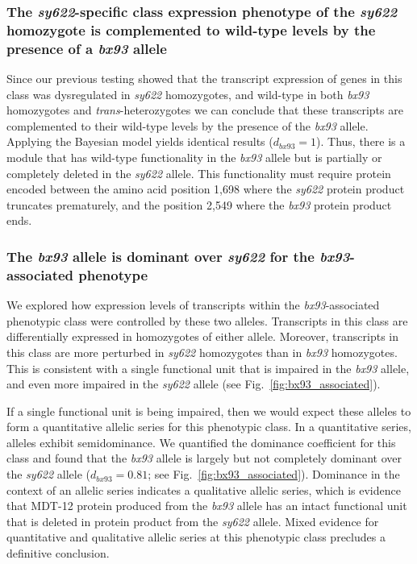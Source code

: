 \documentclass[10pt, twocolumn]{article}
\newcommand{\protein}[1]{\mbox{\uppercase{#1}}}
\begin{document}
\subsubsection*{The \emph{sy622}-specific class expression phenotype of the
                \emph{sy622} homozygote is complemented to wild-type levels by
                the presence of a \emph{bx93} allele}
Since our previous testing showed that the transcript expression of genes in
this class was dysregulated in \emph{sy622} homozygotes, and wild-type in both
\emph{bx93} homozygotes and \emph{trans}-heterozygotes we can conclude that
these transcripts are complemented to their wild-type levels by the presence of
the \emph{bx93} allele. Applying the Bayesian model yields identical results
($d_{bx93} = 1$). Thus, there is a module that has wild-type functionality in
the \emph{bx93} allele but is partially or completely deleted in the
\emph{sy622} allele. This functionality must require protein encoded between the
amino acid position 1,698 where the \emph{sy622} protein product truncates
prematurely, and the position 2,549 where the \emph{bx93} protein product ends.

\subsubsection*{The \emph{bx93} allele is dominant over \emph{sy622} for the
                \emph{bx93}-associated phenotype}
We explored how expression levels of transcripts within the
\emph{bx93}-associated phenotypic class were controlled by these two alleles.
Transcripts in this class are differentially expressed in homozygotes of either
allele. Moreover, transcripts in this class are more perturbed in \emph{sy622}
homozygotes than in \emph{bx93} homozygotes. This is consistent with a single
functional unit that is impaired in the \emph{bx93} allele, and even more
impaired in the \emph{sy622} allele (see Fig.~\ref{fig:bx93_associated}).

If a single functional unit is being impaired, then we would expect these
alleles to form a quantitative allelic series for this phenotypic class. In a
quantitative series, alleles exhibit semidominance. We quantified the dominance
coefficient for this class and found that the \emph{bx93} allele is largely but
not completely dominant over the \emph{sy622} allele ($d_{bx93}=0.81$; see
Fig.~\ref{fig:bx93_associated}). Dominance in the context of an allelic series
indicates a qualitative allelic series, which is evidence that \protein{MDT-12}
protein produced from the \emph{bx93} allele has an intact functional unit that
is deleted in protein product from the \emph{sy622} allele. Mixed evidence for
quantitative and qualitative allelic series at this phenotypic class precludes a
definitive conclusion.
\end{document}
